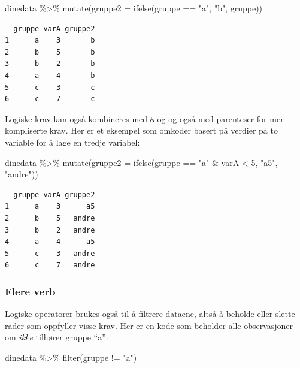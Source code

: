 \documentclass[
  letterpaper,
  DIV=11,
  numbers=noendperiod]{scrreprt}
\newenvironment{Shaded}{\begin{snugshade}}{\end{snugshade}}
\newcommand{\AttributeTok}[1]{\textcolor[rgb]{0.40,0.45,0.13}{#1}}
\newcommand{\DecValTok}[1]{\textcolor[rgb]{0.68,0.00,0.00}{#1}}
\newcommand{\FunctionTok}[1]{\textcolor[rgb]{0.28,0.35,0.67}{#1}}
\newcommand{\NormalTok}[1]{\textcolor[rgb]{0.00,0.23,0.31}{#1}}
\newcommand{\SpecialCharTok}[1]{\textcolor[rgb]{0.37,0.37,0.37}{#1}}
\newcommand{\StringTok}[1]{\textcolor[rgb]{0.13,0.47,0.30}{#1}}
\theoremstyle{definition}
\theoremstyle{remark}
\begin{document}
\begin{Shaded}
\begin{Highlighting}[]
\NormalTok{dinedata }\SpecialCharTok{\%\textgreater{}\%} 
  \FunctionTok{mutate}\NormalTok{(}\AttributeTok{gruppe2 =} \FunctionTok{ifelse}\NormalTok{(gruppe }\SpecialCharTok{==} \StringTok{"a"}\NormalTok{, }\StringTok{"b"}\NormalTok{, gruppe))}
\end{Highlighting}
\end{Shaded}

\begin{verbatim}
  gruppe varA gruppe2
1      a    3       b
2      b    5       b
3      b    2       b
4      a    4       b
5      c    3       c
6      c    7       c
\end{verbatim}

Logiske krav kan også kombineres med \texttt{\&} og \texttt{\textbar{}}
og også med parenteser for mer kompliserte krav. Her er et eksempel som
omkoder basert på verdier på to variable for å lage en tredje variabel:

\begin{Shaded}
\begin{Highlighting}[]
\NormalTok{dinedata }\SpecialCharTok{\%\textgreater{}\%} 
  \FunctionTok{mutate}\NormalTok{(}\AttributeTok{gruppe2 =} \FunctionTok{ifelse}\NormalTok{(gruppe }\SpecialCharTok{==} \StringTok{"a"} \SpecialCharTok{\&}\NormalTok{ varA }\SpecialCharTok{\textless{}} \DecValTok{5}\NormalTok{, }\StringTok{"a5"}\NormalTok{, }\StringTok{"andre"}\NormalTok{))}
\end{Highlighting}
\end{Shaded}

\begin{verbatim}
  gruppe varA gruppe2
1      a    3      a5
2      b    5   andre
3      b    2   andre
4      a    4      a5
5      c    3   andre
6      c    7   andre
\end{verbatim}

\hypertarget{flere-verb}{%
\subsubsection{Flere verb}\label{flere-verb}}

Logiske operatorer brukes også til å filtrere dataene, altså å beholde
eller slette rader som oppfyller visse krav. Her er en kode som beholder
alle observasjoner om \emph{ikke} tilhører gruppe ``a'':

\begin{Shaded}
\begin{Highlighting}[]
\NormalTok{dinedata }\SpecialCharTok{\%\textgreater{}\%} 
  \FunctionTok{filter}\NormalTok{(gruppe }\SpecialCharTok{!=} \StringTok{"a"}\NormalTok{)}
\end{Highlighting}
\end{Shaded}
\end{document}
